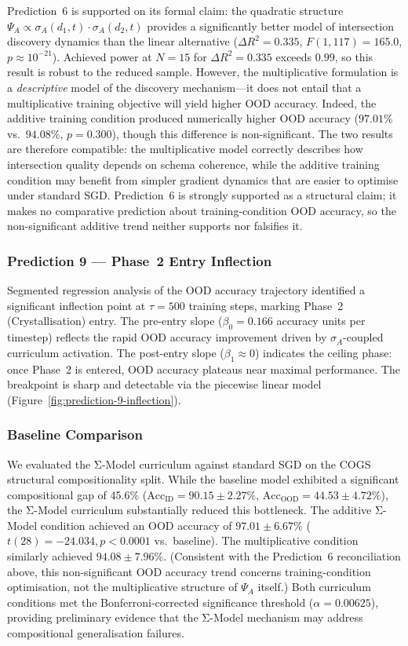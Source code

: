 \documentclass[10pt]{article}
\begin{document}
Prediction~6 is supported on its formal claim: the quadratic
structure $\Psi_A \propto \sigma_A(d_1, t) \cdot \sigma_A(d_2, t)$
provides a significantly better model of intersection discovery
dynamics than the linear alternative
($\Delta R^2 = 0.335$, $F(1,117) = 165.0$, $p \approx 10^{-21}$).
Achieved power at $N = 15$ for $\Delta R^2 = 0.335$ exceeds
$0.99$, so this result is robust to the reduced sample.
However, the multiplicative formulation is a \emph{descriptive} model
of the discovery mechanism---it does not entail that a multiplicative
training objective will yield higher OOD accuracy. Indeed, the
additive training condition produced numerically higher OOD accuracy
($97.01\%$ vs.\ $94.08\%$, $p = 0.300$), though this difference is
non-significant. The two results are therefore compatible: the
multiplicative model correctly describes how intersection quality
depends on schema coherence, while the additive training condition may
benefit from simpler gradient dynamics that are easier to optimise
under standard SGD. Prediction~6 is strongly supported as a structural claim;
it makes no comparative prediction about training-condition OOD
accuracy, so the non-significant additive trend neither supports nor
falsifies it.



\subsubsection{Prediction 9 --- Phase~2 Entry Inflection}
Segmented regression analysis of the OOD accuracy trajectory identified a significant inflection point at $\hat{\tau} = 500$ training steps, marking Phase~2 (Crystallisation) entry. The pre-entry slope ($\beta_0 = 0.166$ accuracy units per timestep) reflects the rapid OOD accuracy improvement driven by $\sigma_A$-coupled curriculum activation. The post-entry slope ($\beta_1 \approx 0$) indicates the ceiling phase: once Phase~2 is entered, OOD accuracy plateaus near maximal performance. The breakpoint is sharp and detectable via the piecewise linear model (Figure~\ref{fig:prediction-9-inflection}).



\subsubsection{Baseline Comparison}
We evaluated the Σ-Model curriculum against standard SGD on the COGS structural compositionality split. While the baseline model exhibited a significant compositional gap of 45.6\% ($\text{Acc}_{\text{ID}} = 90.15 \pm 2.27\%$, $\text{Acc}_{\text{OOD}} = 44.53 \pm 4.72\%$), the Σ-Model curriculum substantially reduced this bottleneck. The additive Σ-Model condition achieved an OOD accuracy of $97.01 \pm 6.67\%$ ($t(28) = -24.034, p < 0.0001$ vs.\ baseline). The multiplicative condition similarly achieved $94.08 \pm 7.96\%$. (Consistent with the Prediction~6 reconciliation above, this non-significant OOD accuracy trend concerns training-condition optimisation, not the multiplicative structure of $\Psi_A$ itself.) Both curriculum conditions met the Bonferroni-corrected significance threshold ($\alpha = 0.00625$), providing preliminary evidence that the Σ-Model mechanism may address compositional generalisation failures.
\end{document}
